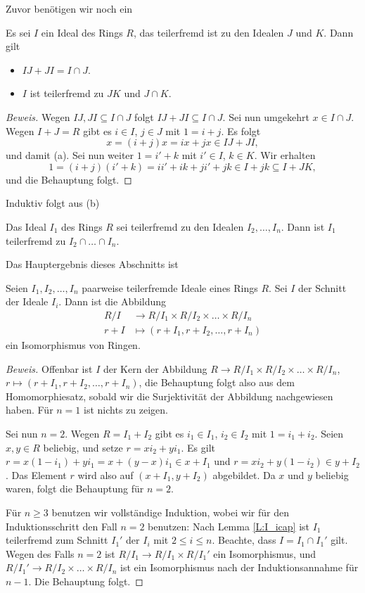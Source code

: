 \documentclass[12pt,a4paper,twoside]{article}
\begin{document}
Zuvor ben\"otigen wir noch ein
\begin{Lemma}\label{L:I+JK}
  Es sei $I$ ein Ideal des Rings $R$, das teilerfremd ist zu den Idealen $J$
  und $K$. Dann gilt\begin{itemize}
\item[(a)] $IJ+JI=I\cap J$.
\item[(b)] $I$ ist teilerfremd zu $JK$ und $J\cap K$.
  \end{itemize}
\end{Lemma}
\begin{proof}[Beweis]
  Wegen $IJ,JI\subseteq I\cap J$ folgt $IJ+JI\subseteq I\cap J$. Sei nun
  umgekehrt $x\in I\cap J$. Wegen $I+J=R$ gibt es $i\in I$, $j\in J$ mit
  $1=i+j$. Es folgt
\[
x=(i+j)x=ix+jx\in IJ+JI,
\]
und damit (a). Sei nun weiter $1=i'+k$ mit $i'\in I$, $k\in K$. Wir erhalten
\[
1=(i+j)(i'+k)=ii'+ik+ji'+jk\in I+jk\subseteq I+JK,
\]
und die Behauptung folgt.
\end{proof}
Induktiv folgt aus (b)
\begin{Lemma}\label{L:I_icap}
  Das Ideal $I_1$ des Rings $R$ sei teilerfremd zu den Idealen
  $I_2,\dots,I_n$. Dann ist $I_1$ teilerfremd zu $I_2\cap\dots\cap I_n$.
\end{Lemma}
Das Hauptergebnis dieses Abschnitts ist
\begin{Satz}
  Seien $I_1,I_2,\dots,I_n$ paarweise teilerfremde Ideale eines Rings
  $R$. Sei $I$ der Schnitt der Ideale $I_i$. Dann ist die Abbildung
\begin{align*}
R/I &\to R/I_1\times R/I_2\times\dots\times R/I_n\\
r+I &\mapsto (r+I_1,r+I_2,\dots,r+I_n)
\end{align*}
ein Isomorphismus von Ringen.
\end{Satz}
\begin{proof}[Beweis]
Offenbar ist $I$ der Kern der Abbildung $R\to R/I_1\times
R/I_2\times\dots\times R/I_n$, $r\mapsto (r+I_1,r+I_2,\dots,r+I_n)$, die
Behauptung folgt also aus dem Homomorphiesatz, sobald wir die Surjektivit\"at
der Abbildung nachgewiesen haben. F\"ur $n=1$ ist nichts zu zeigen.

Sei nun $n=2$. Wegen $R=I_1+I_2$ gibt es $i_1\in I_1$, $i_2\in I_2$ mit
$1=i_1+i_2$. Seien $x,y\in R$ beliebig, und setze $r=xi_2+yi_1$. Es gilt
$r=x(1-i_1)+yi_1=x+(y-x)i_1\in x+I_1$ und $r=xi_2+y(1-i_2)\in y+I_2$. Das
Element $r$ wird also auf $(x+I_1,y+I_2)$ abgebildet. Da $x$ und $y$ beliebig
waren, folgt die Behauptung f\"ur $n=2$.

F\"ur $n\ge3$ benutzen wir vollst\"andige Induktion, wobei wir f\"ur den
Induktionsschritt den Fall $n=2$ benutzen: Nach Lemma \ref{L:I_icap} ist $I_1$
teilerfremd zum Schnitt $I_1'$ der $I_i$ mit $2\le i\le n$. Beachte, dass
$I=I_1\cap I_1'$ gilt. Wegen des Falls $n=2$ ist $R/I_1\to R/I_1\times R/I_1'$
ein Isomorphismus, und $R/I_1'\to R/I_2\times\dots\times R/I_n$ ist ein
Isomorphismus nach der Induktionsannahme f\"ur $n-1$. Die Behauptung folgt.
\end{proof}
\end{document}
